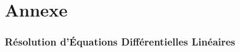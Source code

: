 \documentclass[a4paper]{article}
\begin{document}
\newpage




















\part{Annexe}










\section{Résolution d'Équations Différentielles Linéaires}
\end{document}
